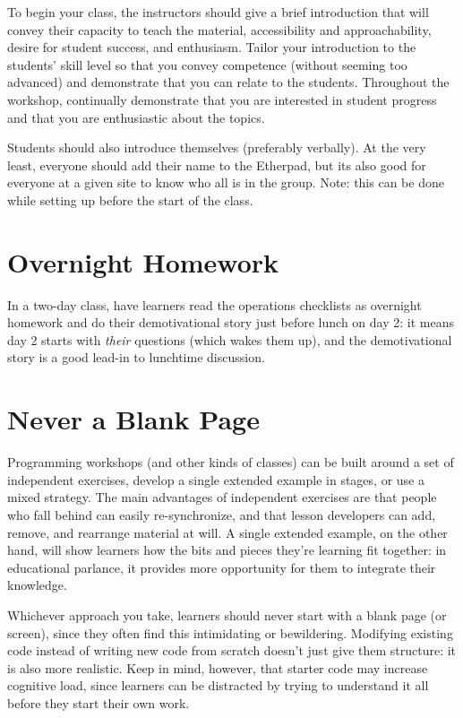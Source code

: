 \documentclass[10pt,statementpaper]{memoir}
\begin{document}
To begin your class, the instructors should give a brief introduction
that will convey their capacity to teach the material, accessibility and
approachability, desire for student success, and enthusiasm. Tailor your
introduction to the students' skill level so that you convey competence
(without seeming too advanced) and demonstrate that you can relate to
the students. Throughout the workshop, continually demonstrate that you
are interested in student progress and that you are enthusiastic about
the topics.

Students should also introduce themselves (preferably verbally). At the
very least, everyone should add their name to the Etherpad, but its also
good for everyone at a given site to know who all is in the group. Note:
this can be done while setting up before the start of the class.

\section{Overnight Homework}\label{overnight-homework}

In a two-day class, have learners read the operations checklists as
overnight homework and do their demotivational story just before lunch
on day 2: it means day 2 starts with \emph{their} questions (which wakes
them up), and the demotivational story is a good lead-in to lunchtime
discussion.

\section{Never a Blank Page}\label{never-a-blank-page}

Programming workshops (and other kinds of classes) can be built around a
set of independent exercises, develop a single extended example in
stages, or use a mixed strategy. The main advantages of independent
exercises are that people who fall behind can easily re-synchronize, and
that lesson developers can add, remove, and rearrange material at will.
A single extended example, on the other hand, will show learners how the
bits and pieces they're learning fit together: in educational parlance,
it provides more opportunity for them to integrate their knowledge.

Whichever approach you take, learners should never start with a blank
page (or screen), since they often find this intimidating or
bewildering. Modifying existing code instead of writing new code from
scratch doesn't just give them structure: it is also more realistic.
Keep in mind, however, that starter code may increase cognitive load,
since learners can be distracted by trying to understand it all before
they start their own work.
\end{document}

